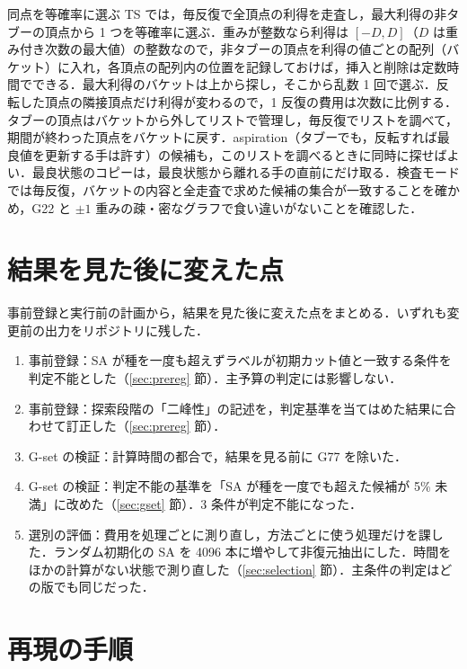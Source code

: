 同点を等確率に選ぶ TS では，毎反復で全頂点の利得を走査し，最大利得の非タブーの頂点から 1 つを等確率に選ぶ．重みが整数なら利得は $[-D, D]$（$D$ は重み付き次数の最大値）の整数なので，非タブーの頂点を利得の値ごとの配列（バケット）に入れ，各頂点の配列内の位置を記録しておけば，挿入と削除は定数時間でできる．最大利得のバケットは上から探し，そこから乱数 1 回で選ぶ．反転した頂点の隣接頂点だけ利得が変わるので，1 反復の費用は次数に比例する．タブーの頂点はバケットから外してリストで管理し，毎反復でリストを調べて，期間が終わった頂点をバケットに戻す．aspiration（タブーでも，反転すれば最良値を更新する手は許す）の候補も，このリストを調べるときに同時に探せばよい．最良状態のコピーは，最良状態から離れる手の直前にだけ取る．検査モードでは毎反復，バケットの内容と全走査で求めた候補の集合が一致することを確かめ，G22 と $\pm1$ 重みの疎・密なグラフで食い違いがないことを確認した．

\section{結果を見た後に変えた点}\label{app:changes}

事前登録と実行前の計画から，結果を見た後に変えた点をまとめる．いずれも変更前の出力をリポジトリに残した．
\begin{enumerate}
  \item 事前登録：SA が種を一度も超えずラベルが初期カット値と一致する条件を判定不能とした（\ref{sec:prereg} 節）．主予算の判定には影響しない．
  \item 事前登録：探索段階の「二峰性」の記述を，判定基準を当てはめた結果に合わせて訂正した（\ref{sec:prereg} 節）．
  \item G-set の検証：計算時間の都合で，結果を見る前に G77 を除いた．
  \item G-set の検証：判定不能の基準を「SA が種を一度でも超えた候補が 5\% 未満」に改めた（\ref{sec:gset} 節）．3 条件が判定不能になった．
  \item 選別の評価：費用を処理ごとに測り直し，方法ごとに使う処理だけを課した．ランダム初期化の SA を 4096 本に増やして非復元抽出にした．時間をほかの計算がない状態で測り直した（\ref{sec:selection} 節）．主条件の判定はどの版でも同じだった．
\end{enumerate}

\section{再現の手順}\label{app:repro}

